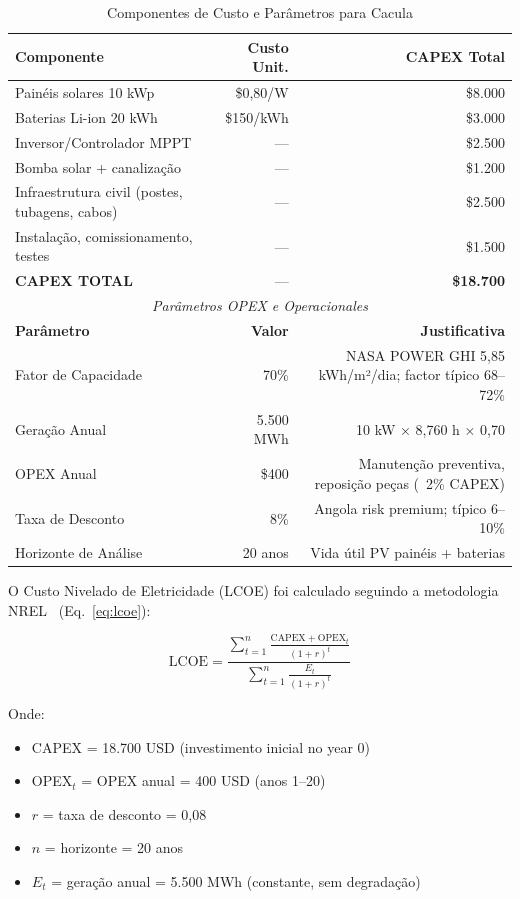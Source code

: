 \documentclass[12pt, a4paper]{article}
\begin{document}
\begin{table}[H]
\centering
\caption{Componentes de Custo e Parâmetros para Cacula}
\label{tab:cacula_lcoe}
\small
\begin{tabular}{|l|r|r|}
\hline
\textbf{Componente} & \textbf{Custo Unit.} & \textbf{CAPEX Total} \\
\hline
Painéis solares 10 kWp & \$0,80/W & \$8.000 \\
Baterias Li-ion 20 kWh & \$150/kWh & \$3.000 \\
Inversor/Controlador MPPT & --- & \$2.500 \\
Bomba solar + canalização & --- & \$1.200 \\
Infraestrutura civil (postes, tubagens, cabos) & --- & \$2.500 \\
Instalação, comissionamento, testes & --- & \$1.500 \\
\hline
\textbf{CAPEX TOTAL} & --- & \textbf{\$18.700} \\
\hline
\multicolumn{3}{c}{\textit{Parâmetros OPEX e Operacionales}} \\
\hline
\textbf{Parâmetro} & \textbf{Valor} & \textbf{Justificativa} \\
\hline
Fator de Capacidade & 70\% & NASA POWER GHI 5,85 kWh/m²/dia; factor típico 68–72\% \\
Geração Anual & 5.500 MWh & 10 kW × 8,760 h × 0,70 \\
OPEX Anual & \$400 & Manutenção preventiva, reposição peças (~2\% CAPEX) \\
Taxa de Desconto & 8\% & Angola risk premium; típico 6–10\% \\
Horizonte de Análise & 20 anos & Vida útil PV painéis + baterias \\
\hline
\end{tabular}
\end{table}

O Custo Nivelado de Eletricidade (LCOE) foi calculado seguindo a metodologia NREL~\citep{NREL2020} (Eq.~\ref{eq:lcoe}):

\begin{equation}
\label{eq:lcoe}
\text{LCOE} = \frac{\sum_{t=1}^{n} \frac{\text{CAPEX} + \text{OPEX}_t}{(1+r)^t}}{\sum_{t=1}^{n} \frac{E_t}{(1+r)^t}}
\end{equation}

Onde:
\begin{itemize}
\item CAPEX = 18.700 USD (investimento inicial no year 0)
\item OPEX$_t$ = OPEX anual = 400 USD (anos 1–20)
\item $r$ = taxa de desconto = 0,08
\item $n$ = horizonte = 20 anos
\item $E_t$ = geração anual = 5.500 MWh (constante, sem degradação)
\end{itemize}
\end{document}
